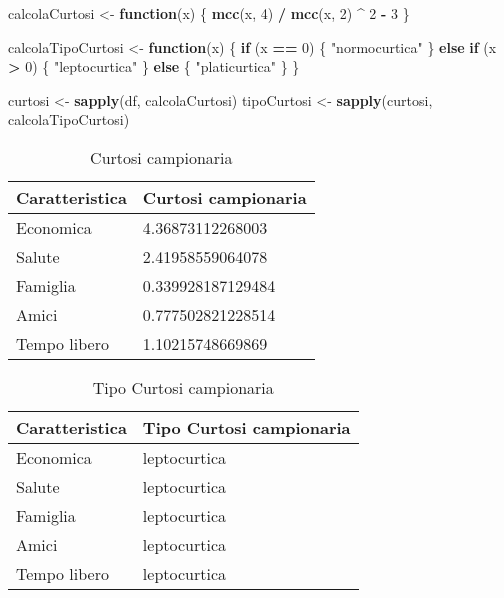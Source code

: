 \documentclass[]{book}
\newenvironment{Shaded}{\begin{snugshade}}{\end{snugshade}}
\newcommand{\KeywordTok}[1]{\textcolor[rgb]{0.13,0.29,0.53}{\textbf{#1}}}
\newcommand{\DecValTok}[1]{\textcolor[rgb]{0.00,0.00,0.81}{#1}}
\newcommand{\StringTok}[1]{\textcolor[rgb]{0.31,0.60,0.02}{#1}}
\newcommand{\ControlFlowTok}[1]{\textcolor[rgb]{0.13,0.29,0.53}{\textbf{#1}}}
\newcommand{\OperatorTok}[1]{\textcolor[rgb]{0.81,0.36,0.00}{\textbf{#1}}}
\newcommand{\NormalTok}[1]{#1}
\begin{document}
\begin{Shaded}
\begin{Highlighting}[]
\NormalTok{calcolaCurtosi <-}\StringTok{ }\ControlFlowTok{function}\NormalTok{(x) \{}
  \KeywordTok{mcc}\NormalTok{(x, }\DecValTok{4}\NormalTok{) }\OperatorTok{/}\StringTok{ }\KeywordTok{mcc}\NormalTok{(x, }\DecValTok{2}\NormalTok{) }\OperatorTok{^}\StringTok{ }\DecValTok{2} \OperatorTok{-}\StringTok{ }\DecValTok{3}
\NormalTok{\}}

\NormalTok{calcolaTipoCurtosi <-}\StringTok{ }\ControlFlowTok{function}\NormalTok{(x) \{}
  \ControlFlowTok{if}\NormalTok{ (x }\OperatorTok{==}\StringTok{ }\DecValTok{0}\NormalTok{) \{}
    \StringTok{"normocurtica"}
\NormalTok{  \} }\ControlFlowTok{else} \ControlFlowTok{if}\NormalTok{ (x }\OperatorTok{>}\StringTok{ }\DecValTok{0}\NormalTok{) \{}
    \StringTok{"leptocurtica"}
\NormalTok{  \} }\ControlFlowTok{else}\NormalTok{ \{}
    \StringTok{"platicurtica"}
\NormalTok{  \}}
\NormalTok{\}}

\NormalTok{curtosi <-}\StringTok{ }\KeywordTok{sapply}\NormalTok{(df, calcolaCurtosi)}
\NormalTok{tipoCurtosi <-}\StringTok{ }\KeywordTok{sapply}\NormalTok{(curtosi, calcolaTipoCurtosi)}
\end{Highlighting}
\end{Shaded}

\begin{table}

\caption{\label{tab:curtosi}Curtosi campionaria}
\centering
\begin{tabular}[t]{l|l}
\hline
Caratteristica & Curtosi campionaria\\
\hline
Economica & 4.36873112268003\\
\hline
Salute & 2.41958559064078\\
\hline
Famiglia & 0.339928187129484\\
\hline
Amici & 0.777502821228514\\
\hline
Tempo libero & 1.10215748669869\\
\hline
\end{tabular}
\end{table}\begin{table}

\caption{\label{tab:tipo-curtosi}Tipo Curtosi campionaria}
\centering
\begin{tabular}[t]{l|l}
\hline
Caratteristica & Tipo Curtosi campionaria\\
\hline
Economica & leptocurtica\\
\hline
Salute & leptocurtica\\
\hline
Famiglia & leptocurtica\\
\hline
Amici & leptocurtica\\
\hline
Tempo libero & leptocurtica\\
\hline
\end{tabular}
\end{table}
\end{document}

